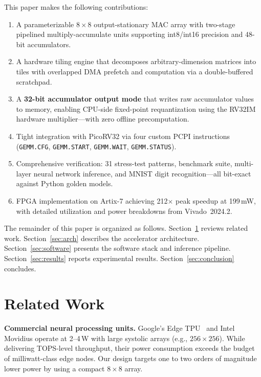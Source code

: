 \documentclass[conference]{IEEEtran}
\begin{document}
This paper makes the following contributions:
\begin{enumerate}
    \item A parameterizable $8\times8$ output-stationary MAC array with two-stage pipelined multiply-accumulate units supporting int8/int16 precision and 48-bit accumulators.
    \item A hardware tiling engine that decomposes arbitrary-dimension matrices into tiles with overlapped DMA prefetch and computation via a double-buffered scratchpad.
    \item A \textbf{32-bit accumulator output mode} that writes raw accumulator values to memory, enabling CPU-side fixed-point requantization using the RV32IM hardware multiplier---with zero offline precomputation.
    \item Tight integration with PicoRV32 via four custom PCPI instructions (\texttt{GEMM.CFG}, \texttt{GEMM.START}, \texttt{GEMM.WAIT}, \texttt{GEMM.STATUS}).
    \item Comprehensive verification: 31 stress-test patterns, benchmark suite, multi-layer neural network inference, and MNIST digit recognition---all bit-exact against Python golden models.
    \item FPGA implementation on Artix-7 achieving 212$\times$ peak speedup at 199\,mW, with detailed utilization and power breakdowns from Vivado~2024.2.
\end{enumerate}

The remainder of this paper is organized as follows. Section~\ref{sec:related} reviews related work. Section~\ref{sec:arch} describes the accelerator architecture. Section~\ref{sec:software} presents the software stack and inference pipeline. Section~\ref{sec:results} reports experimental results. Section~\ref{sec:conclusion} concludes.

\section{Related Work}
\label{sec:related}

\textbf{Commercial neural processing units.}
Google's Edge TPU~\cite{edgetpu} and Intel Movidius operate at 2--4\,W with large systolic arrays (e.g., $256\times256$). While delivering TOPS-level throughput, their power consumption exceeds the budget of milliwatt-class edge nodes. Our design targets one to two orders of magnitude lower power by using a compact $8\times8$ array.
\end{document}
